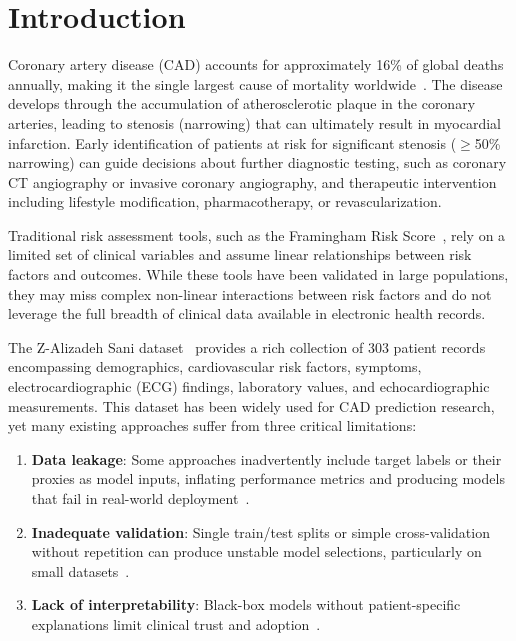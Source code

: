\documentclass[conference]{IEEEtran}
\begin{document}
\section{Introduction}

Coronary artery disease (CAD) accounts for approximately 16\% of global deaths annually, making it the single largest cause of mortality worldwide~\cite{virani2020}. The disease develops through the accumulation of atherosclerotic plaque in the coronary arteries, leading to stenosis (narrowing) that can ultimately result in myocardial infarction. Early identification of patients at risk for significant stenosis ($\geq$50\% narrowing) can guide decisions about further diagnostic testing, such as coronary CT angiography or invasive coronary angiography, and therapeutic intervention including lifestyle modification, pharmacotherapy, or revascularization.

Traditional risk assessment tools, such as the Framingham Risk Score~\cite{framingham}, rely on a limited set of clinical variables and assume linear relationships between risk factors and outcomes. While these tools have been validated in large populations, they may miss complex non-linear interactions between risk factors and do not leverage the full breadth of clinical data available in electronic health records.

The Z-Alizadeh Sani dataset~\cite{alizadeh2018} provides a rich collection of 303 patient records encompassing demographics, cardiovascular risk factors, symptoms, electrocardiographic (ECG) findings, laboratory values, and echocardiographic measurements. This dataset has been widely used for CAD prediction research, yet many existing approaches suffer from three critical limitations:

\begin{enumerate}
    \item \textbf{Data leakage}: Some approaches inadvertently include target labels or their proxies as model inputs, inflating performance metrics and producing models that fail in real-world deployment~\cite{kaufman2020}.
    \item \textbf{Inadequate validation}: Single train/test splits or simple cross-validation without repetition can produce unstable model selections, particularly on small datasets~\cite{abdar2019}.
    \item \textbf{Lack of interpretability}: Black-box models without patient-specific explanations limit clinical trust and adoption~\cite{lundberg2017}.
\end{enumerate}
\end{document}
